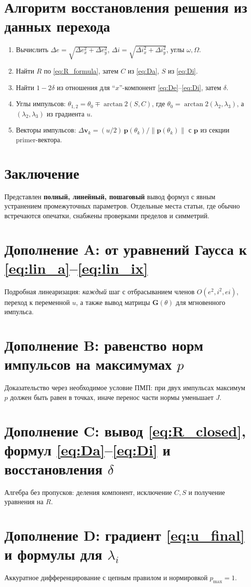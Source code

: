 \documentclass[12pt,a4paper]{article}
\newcommand{\vv}[1]{\bm{#1}}
\begin{document}
\section{Алгоритм восстановления решения из данных перехода}
\begin{enumerate}[label=\arabic*.]
\item Вычислить $\Delta e=\sqrt{\Delta e_x^2+\Delta e_y^2}$, $\Delta i=\sqrt{\Delta i_x^2+\Delta i_y^2}$, углы $\omega,\Omega$.
\item Найти $R$ по \eqref{eq:R_formula}, затем $C$ из \eqref{eq:Da}, $S$ из \eqref{eq:Di}.
\item Найти $1-2\delta$ из отношения для ``$x$''-компонент \eqref{eq:De}--\eqref{eq:Di}, затем $\delta$.
\item Углы импульсов: $\theta_{1,2}=\theta_0\mp \arctan2(S,C)$, где $\theta_0=\arctan2(\lambda_2,\lambda_3)$, а $(\lambda_2,\lambda_3)$ из градиента $u$.
\item Векторы импульсов: $\Delta\vv v_k=(u/2)\,\vv p(\theta_k)/\|\vv p(\theta_k)\|$ с $\vv p$ из секции primer-вектора.
\end{enumerate}

\section*{Заключение}
Представлен \textbf{полный, линейный, пошаговый} вывод формул с явным устранением промежуточных параметров. Отдельные места статьи, где обычно встречаются опечатки, снабжены проверками пределов и симметрий.

\appendix
\section{Дополнение A: от уравнений Гаусса к \eqref{eq:lin_a}--\eqref{eq:lin_ix}}
Подробная линеаризация: \emph{каждый} шаг с отбрасыванием членов $O(e^2,i^2,ei)$, переход к переменной $u$, а также вывод матрицы $\mathbf{G}(\theta)$ для мгновенного импульса.

\section{Дополнение B: равенство норм импульсов на максимумах $p$}
Доказательство через необходимое условие ПМП: при двух импульсах максимум $p$ должен быть равен в точках, иначе перенос части нормы уменьшает $J$.

\section{Дополнение C: вывод \eqref{eq:R_closed}, формул \eqref{eq:Da}--\eqref{eq:Di} и восстановления $\delta$}
Алгебра без пропусков: деления компонент, исключение $C,S$ и получение уравнения на $R$.

\section{Дополнение D: градиент \eqref{eq:u_final} и формулы для $\lambda_i$}
Аккуратное дифференцирование с цепным правилом и нормировкой $p_{\max}=1$.
\end{document}
